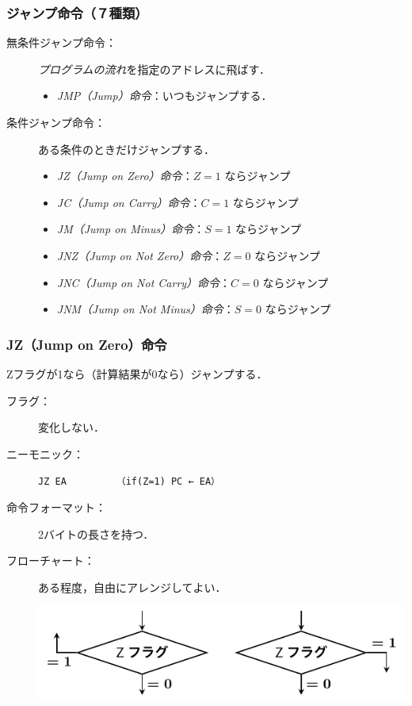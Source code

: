 \documentclass[handout]{beamer}        %
\begin{document}
\begin{frame}
  \frametitle{ジャンプ命令（７種類）}
  \begin{description}
  \item[無条件ジャンプ命令：]\emph{プログラムの流れ}を指定のアドレスに飛ばす．
    \begin{itemize}
      \item \emph{JMP（Jump）命令}：いつもジャンプする．
    \end{itemize}
    \vfill
  \item[条件ジャンプ命令：]ある条件のときだけジャンプする．
    \begin{itemize}
      \item \emph{JZ（Jump on Zero）命令}：$Z=1$ ならジャンプ
        \vfill
      \item \emph{JC（Jump on Carry）命令}：$C=1$ ならジャンプ
        \vfill
      \item \emph{JM（Jump on Minus）命令}：$S=1$ ならジャンプ
        \vfill
      \item \emph{JNZ（Jump on Not Zero）命令}：$Z=0$ ならジャンプ
        \vfill
      \item \emph{JNC（Jump on Not Carry）命令}：$C=0$ ならジャンプ
        \vfill
      \item \emph{JNM（Jump on Not Minus）命令}：$S=0$ ならジャンプ
    \end{itemize}
  \end{description}
  \vfill
\end{frame}

\begin{frame}
  \frametitle{JZ（Jump on Zero）命令}
  Zフラグが1なら（計算結果が0なら）ジャンプする．
  \vfill
  \begin{description}
  \item[フラグ：] 変化しない．
    \vfill

  \item[ニーモニック：]\texttt{JZ EA}~~~~~~~~~\texttt{（if(Z=1) PC ← EA）}
    \vfill

  \item[命令フォーマット：] 2バイトの長さを持つ．\\
    \vfill

  \item[フローチャート：] ある程度，自由にアレンジしてよい．\\
    \centerline{\includegraphics[scale=0.7]{../Tikz/jz.pdf}}
  \end{description}
  \vfill
\end{frame}
\end{document}
